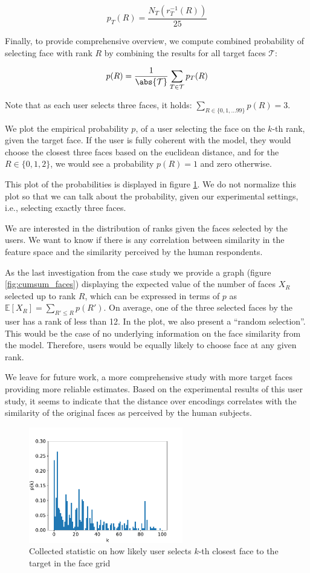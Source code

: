 $$
    p_T(R) = \frac{N_T(r_T^{-1}(R))}{25}
$$

Finally, to provide comprehensive overview, we compute combined probability of selecting face with rank $R$ by combining the results for all target faces $\mathcal{T}$:

$$
p(R) = \frac{1}{\abs{\mathcal{T}}}\sum_{T\in \mathcal{T}} p_T(R)
$$

Note that as each user selects three faces, it holds: $\sum_{R\in\{0,1,\ldots99\}} p(R) = 3$.

We plot the empirical probability $p$, of a user selecting the face on the $k$-th rank, given the target face. If the user is fully coherent with the model, they would choose the closest three faces based on the euclidean distance, and for the $R \in \{0,1,2\}$, we would see a probability $p(R) = 1$ and zero otherwise. 

This plot of the probabilities is displayed in figure \ref{fig:survey_distribution}. We do not normalize this plot so that we can talk about the probability, given our experimental settings, i.e., selecting exactly three faces.

We are interested in the distribution of ranks given the faces selected by the users. We want to know if there is any correlation between similarity in the feature space and the similarity perceived by the human respondents. 

As the last investigation from the case study we provide a graph (figure \ref{fig:cumsum_faces}) displaying the expected value of the number of faces $X_R$ selected up to rank $R$, which can be expressed in terms of $p$ as $\mathbb{E}[X_R] = \sum_{R' \leq R}p(R')$. On average, one of the three selected faces by the user has a rank of less than 12. In the plot, we also present a ``random selection''. This would be the case of no underlying information on the face similarity from the model. Therefore, users would be equally likely to choose face at any given rank.

We leave for future work, a more comprehensive study with more target faces providing more reliable estimates. Based on the experimental results of this user study, it seems to indicate that the distance over encodings correlates with the similarity of the original faces as perceived by the human subjects.

\begin{figure}
    \centering
    \includegraphics[width=0.6\textwidth]{graphs/survey_distribution_without_the_easy.pdf}
    \caption{Collected statistic on how likely user selects $k$-th closest face to the target in the face grid}
    \label{fig:survey_distribution}
\end{figure}


